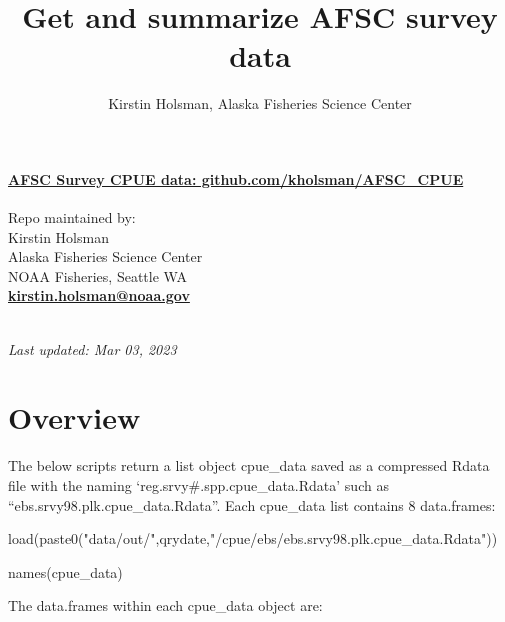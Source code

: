 \documentclass[
]{article}
\title{Get and summarize AFSC survey data}
\author{Kirstin Holsman, Alaska Fisheries Science Center}
\date{}
\newenvironment{Shaded}{\begin{snugshade}}{\end{snugshade}}
\newcommand{\FunctionTok}[1]{\textcolor[rgb]{0.00,0.00,0.00}{#1}}
\newcommand{\NormalTok}[1]{#1}
\newcommand{\StringTok}[1]{\textcolor[rgb]{0.31,0.60,0.02}{#1}}
\begin{document}
\maketitle

{
\setcounter{tocdepth}{2}
\tableofcontents
}
\hypertarget{afsc-survey-cpue-data-github.comkholsmanafsc_cpue}{%
\paragraph{\texorpdfstring{\href{https://github.com/kholsman/AFSC_CPUE}{\textbf{AFSC
Survey CPUE data:
github.com/kholsman/AFSC\_CPUE}}}{AFSC Survey CPUE data: github.com/kholsman/AFSC\_CPUE}}\label{afsc-survey-cpue-data-github.comkholsmanafsc_cpue}}

Repo maintained by:\\
Kirstin Holsman\\
Alaska Fisheries Science Center\\
NOAA Fisheries, Seattle WA\\
\textbf{\url{kirstin.holsman@noaa.gov}}\strut \\
\emph{Last updated: Mar 03, 2023}

\hypertarget{overview}{%
\section{Overview}\label{overview}}

The below scripts return a list object cpue\_data saved as a compressed
Rdata file with the naming `reg.srvy\#.spp.cpue\_data.Rdata' such as
``ebs.srvy98.plk.cpue\_data.Rdata''. Each cpue\_data list contains 8
data.frames:

\begin{Shaded}
\begin{Highlighting}[]
\FunctionTok{load}\NormalTok{(}\FunctionTok{paste0}\NormalTok{(}\StringTok{"data/out/"}\NormalTok{,qrydate,}\StringTok{"/cpue/ebs/ebs.srvy98.plk.cpue\_data.Rdata"}\NormalTok{))}

\FunctionTok{names}\NormalTok{(cpue\_data)}
\end{Highlighting}
\end{Shaded}

The data.frames within each cpue\_data object are:
\end{document}
